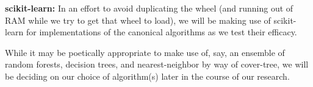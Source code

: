 \documentclass{article}
\begin{document}
\textbf{scikit-learn:}
In an effort to avoid duplicating the wheel (and running out of RAM 
while we try to get that wheel to load), we will be making use of 
scikit-learn for implementations of the canonical algorithms as we test 
their efficacy.

While it may be poetically appropriate to make use of, say, an ensemble 
of random forests, decision trees, and nearest-neighbor by way of 
cover-tree, we will be deciding on our choice of algorithm(s) later in 
the course of our research.
\end{document}
